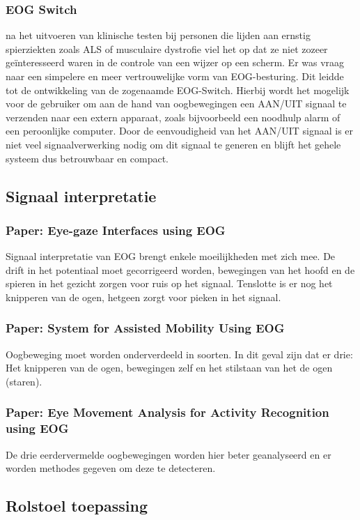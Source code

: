 \documentclass[12pt,a4paper]{article}
\begin{document}
		\subsubsection{EOG Switch}
		na het uitvoeren van klinische testen bij personen die lijden aan ernstig spierziekten zoals ALS of musculaire dystrofie viel het op dat ze niet zozeer ge\"interesseerd waren in de controle van een wijzer op een scherm. Er was vraag naar een simpelere en meer vertrouwelijke vorm van EOG-besturing. Dit leidde tot de ontwikkeling van de zogenaamde EOG-Switch. Hierbij wordt het mogelijk voor de gebruiker om aan de hand van oogbewegingen een AAN/UIT signaal te verzenden naar een extern apparaat, zoals bijvoorbeeld een   
		noodhulp alarm of een peroonlijke computer. Door de eenvoudigheid van het AAN/UIT signaal is er niet veel signaalverwerking nodig om dit signaal te generen en blijft het gehele systeem dus betrouwbaar en compact.
		
	\subsection{Signaal interpretatie}
		\subsubsection{Paper: Eye-gaze Interfaces using EOG}
			Signaal interpretatie van EOG brengt enkele moeilijkheden met zich mee. De drift in het potentiaal moet gecorrigeerd worden, bewegingen van het hoofd en de spieren in het gezicht zorgen voor ruis op het signaal. Tenslotte is er nog het knipperen van de ogen, hetgeen zorgt voor pieken in het signaal.
		\subsubsection{Paper: System for Assisted Mobility Using EOG}
			Oogbeweging moet worden onderverdeeld in soorten. In dit geval zijn dat er drie: Het knipperen van de ogen, bewegingen zelf en het stilstaan van het de ogen (staren).
		\subsubsection{Paper: Eye Movement Analysis for Activity Recognition using EOG}
			De drie eerdervermelde oogbewegingen worden hier beter geanalyseerd en er worden methodes gegeven om deze te detecteren. 
			
	
	\subsection{Rolstoel toepassing}
\end{document}
